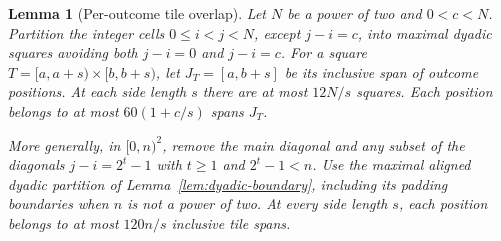 \documentclass[11pt]{article}
\newtheorem{lemma}[theorem]{Lemma}
\begin{document}
\begin{lemma}[Per-outcome tile overlap]\label{lem:outcome-overlap}
Let $N$ be a power of two and $0<c<N$. Partition the integer cells
$0\le i<j<N$, except $j-i=c$, into maximal dyadic squares avoiding both
$j-i=0$ and $j-i=c$. For a square
$T=[a,a+s)\times[b,b+s)$, let $J_T=[a,b+s]$ be its inclusive span of
outcome positions. At each side length $s$ there are at most $12N/s$
squares. Each position belongs to at most $60(1+c/s)$ spans $J_T$.

More generally, in $[0,n)^2$, remove the main diagonal and any subset of
the diagonals $j-i=2^t-1$ with $t\ge1$ and $2^t-1<n$.
Use the maximal aligned dyadic partition of Lemma~\ref{lem:dyadic-boundary},
including its padding boundaries when $n$ is not a power of two.
At every side length $s$, each position belongs to at most $120n/s$
inclusive tile spans.
\end{lemma}
\end{document}
